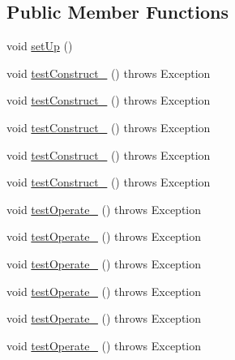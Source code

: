\subsection*{Public Member Functions}
\begin{DoxyCompactItemize}
\item 
void \hyperlink{classorg_1_1jgap_1_1impl_1_1_swapping_mutation_operator_test_ae8e965c964835adea93e874336ab7b0e}{set\-Up} ()
\item 
void \hyperlink{classorg_1_1jgap_1_1impl_1_1_swapping_mutation_operator_test_afb9b6187d59991a85e0a69b6140ffa98}{test\-Construct\-\_} ()  throws Exception 
\item 
void \hyperlink{classorg_1_1jgap_1_1impl_1_1_swapping_mutation_operator_test_ab3d78dde7bca843fe6a9fd98aae50c03}{test\-Construct\-\_} ()  throws Exception 
\item 
void \hyperlink{classorg_1_1jgap_1_1impl_1_1_swapping_mutation_operator_test_ae273099634232cdbebc176638506f454}{test\-Construct\-\_} ()  throws Exception 
\item 
void \hyperlink{classorg_1_1jgap_1_1impl_1_1_swapping_mutation_operator_test_a7b6896b11e97d2e2fb3f62d590bdd2c2}{test\-Construct\-\_} ()  throws Exception 
\item 
void \hyperlink{classorg_1_1jgap_1_1impl_1_1_swapping_mutation_operator_test_a8c2e1d7bda80f00ced99f505343244cc}{test\-Construct\-\_} ()  throws Exception 
\item 
void \hyperlink{classorg_1_1jgap_1_1impl_1_1_swapping_mutation_operator_test_a6a078850197b8d061375dfac791394ef}{test\-Operate\-\_} ()  throws Exception 
\item 
void \hyperlink{classorg_1_1jgap_1_1impl_1_1_swapping_mutation_operator_test_a92fbca72f89b7df34a3bb3d2047f10ee}{test\-Operate\-\_} ()  throws Exception 
\item 
void \hyperlink{classorg_1_1jgap_1_1impl_1_1_swapping_mutation_operator_test_a606d6abc71afa7877799aae21d9a9fa7}{test\-Operate\-\_} ()  throws Exception 
\item 
void \hyperlink{classorg_1_1jgap_1_1impl_1_1_swapping_mutation_operator_test_a5b515c3baa3ad241fd89646060bc293f}{test\-Operate\-\_} ()  throws Exception 
\item 
void \hyperlink{classorg_1_1jgap_1_1impl_1_1_swapping_mutation_operator_test_a09be23267e56fcdb9da67794a156cc84}{test\-Operate\-\_} ()  throws Exception 
\item 
void \hyperlink{classorg_1_1jgap_1_1impl_1_1_swapping_mutation_operator_test_ab8dc00c62c73caa6b70758afe0e766b0}{test\-Operate\-\_} ()  throws Exception 

\end{DoxyCompactItemize}
